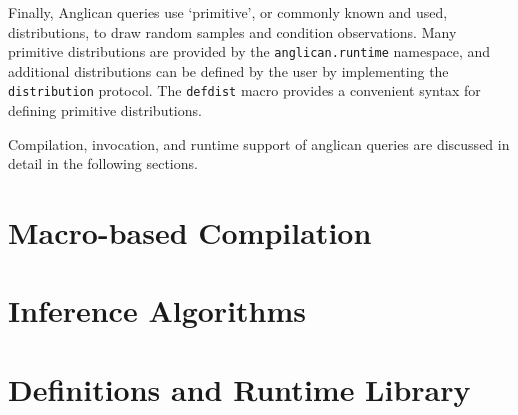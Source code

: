 \documentclass[a4paper]{article}
\begin{document}
Finally, Anglican queries use `primitive', or commonly known
and used, distributions, to draw random samples and condition
observations. Many primitive distributions are provided by the
\texttt{anglican.runtime} namespace, and additional
distributions can be defined by the user by implementing the
\texttt{distribution} protocol. The \texttt{defdist} macro
provides a convenient syntax for defining primitive distributions.

Compilation, invocation, and runtime support of anglican queries
are discussed in detail in the following sections.

\section{Macro-based Compilation}

\section{Inference Algorithms}

\section{Definitions and Runtime Library}




\end{document}
